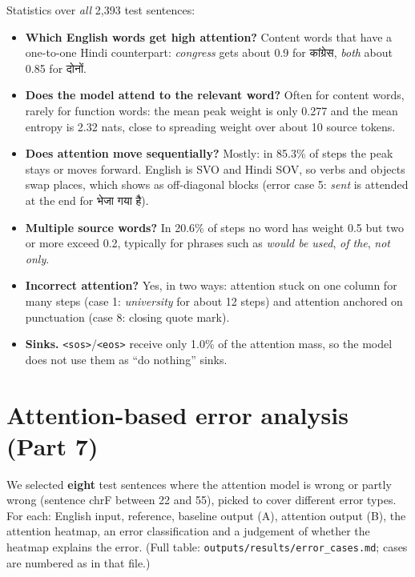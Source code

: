 \documentclass[10pt,a4paper]{article}
\DeclareRobustCommand{\hi}[1]{{\hindifont #1}}
\newcommand{\code}[1]{\texttt{#1}}
\newcommand{\sos}{\texttt{<sos>}}
\newcommand{\eos}{\texttt{<eos>}}
\begin{document}
Statistics over \emph{all} 2,393 test sentences:
\begin{table}[H]\centering\tabAttn\caption{Attention statistics (\code{outputs/results/attention\_behaviour.json}).}\end{table}

\begin{itemize}
\item \textbf{Which English words get high attention?} Content words that have a one-to-one Hindi counterpart: \emph{congress} gets about 0.9 for
\hi{कांग्रेस}, \emph{both} about 0.85 for \hi{दोनों}.
\item \textbf{Does the model attend to the relevant word?} Often for content words, rarely for function words: the mean peak weight is only 0.277 and
the mean entropy is 2.32 nats, close to spreading weight over about 10 source tokens.
\item \textbf{Does attention move sequentially?} Mostly: in 85.3\% of steps the peak stays or moves forward. English is SVO and Hindi SOV, so verbs
and objects swap places, which shows as off-diagonal blocks (error case 5: \emph{sent} is attended at the end for \hi{भेजा गया है}).
\item \textbf{Multiple source words?} In 20.6\% of steps no word has weight 0.5 but two or more exceed 0.2, typically for phrases such as
\emph{would be used}, \emph{of the}, \emph{not only}.
\item \textbf{Incorrect attention?} Yes, in two ways: attention stuck on one column for many steps (case 1: \emph{university} for about 12 steps)
and attention anchored on punctuation (case 8: closing quote mark).
\item \textbf{Sinks.} \sos{}/\eos{} receive only 1.0\% of the attention mass, so the model does not use them as ``do nothing'' sinks.
\end{itemize}

\section{Attention-based error analysis (Part 7)}
We selected \textbf{eight} test sentences where the attention model is wrong or partly wrong (sentence chrF between 22 and 55), picked to cover
different error types. For each: English input, reference, baseline output (A), attention output (B), the attention heatmap, an error
classification and a judgement of whether the heatmap explains the error. (Full table: \code{outputs/results/error\_cases.md}; cases are
numbered as in that file.)
\end{document}
